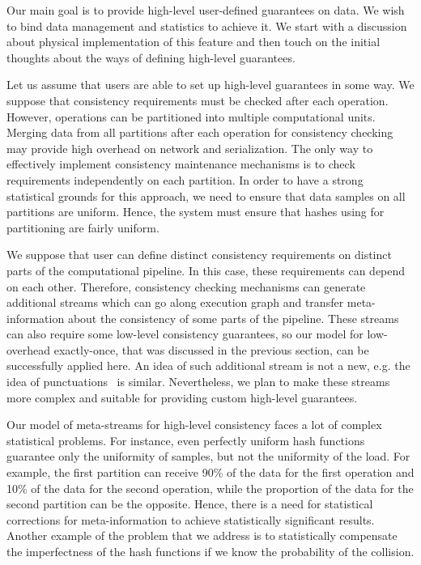 \label{fs-phd-reliable}

Our main goal is to provide high-level user-defined guarantees on data. We wish to bind data management and statistics to achieve it. We start with a discussion about physical implementation of this feature and then touch on the initial thoughts about the ways of defining high-level guarantees.

Let us assume that users are able to set up high-level guarantees in some way. We suppose that consistency requirements must be checked after each operation. However, operations can be partitioned into multiple computational units. Merging data from all partitions after each operation for consistency checking may provide high overhead on network and serialization. The only way to effectively implement consistency maintenance mechanisms is to check requirements independently on each partition. In order to have a strong statistical grounds for this approach, we need to ensure that data samples on all partitions are uniform. Hence, the system must ensure that hashes using for partitioning are fairly uniform.

We suppose that user can define distinct consistency requirements on distinct parts of the computational pipeline. In this case, these requirements can depend on each other. Therefore, consistency checking mechanisms can generate additional streams which can go along execution graph and transfer meta-information about the consistency of some parts of the pipeline. These streams can also require some low-level consistency guarantees, so our model for low-overhead exactly-once, that was discussed in the previous section, can be successfully applied here. An idea of such additional stream is not a new, e.g. the idea of punctuations~\cite{Tucker:2003:EPS:776752.776780} is similar. Nevertheless, we plan to make these streams more complex and suitable for providing custom high-level guarantees.

Our model of meta-streams for high-level consistency faces a lot of complex statistical problems. For instance, even perfectly uniform hash functions guarantee only the uniformity of samples, but not the uniformity of the load. For example, the first partition can receive 90\% of the data for the first operation and 10\% of the data for the second operation, while the proportion of the data for the second partition can be the opposite. Hence, there is a need for statistical corrections for meta-information to achieve statistically significant results. Another example of the problem that we address is to statistically compensate the imperfectness of the hash functions if we know the probability of the collision.  

